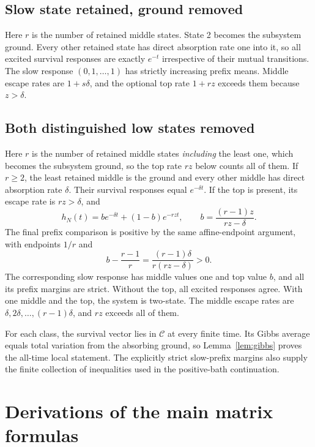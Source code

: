 \documentclass[11pt,a4paper]{article}
\theoremstyle{remark}\newtheorem{remark}[theorem]{Remark}
\newcommand{\C}{\mathcal C}
\begin{document}
\subsection{Slow state retained, ground removed}
Here $r$ is the number of retained middle states. State 2 becomes the subsystem ground. Every other retained state has direct absorption rate one into it, so all excited survival responses are exactly $e^{-t}$ irrespective of their mutual transitions. The slow response $(0,1,\ldots,1)$ has strictly increasing prefix means. Middle escape rates are $1+s\delta$, and the optional top rate $1+rz$ exceeds them because $z>\delta$.

\subsection{Both distinguished low states removed}
Here $r$ is the number of retained middle states \emph{including} the least one, which becomes the subsystem ground, so the top rate $rz$ below counts all of them. If $r\ge2$, the least retained middle is the ground and every other middle has direct absorption rate $\delta$. Their survival responses equal $e^{-\delta t}$. If the top is present, its escape rate is $rz>\delta$, and
\begin{equation}
 h_N(t)=be^{-\delta t}+(1-b)e^{-rzt},\qquad
 b=\frac{(r-1)z}{rz-\delta}.
\end{equation}
The final prefix comparison is positive by the same affine-endpoint argument, with endpoints $1/r$ and
\begin{equation}
 b-\frac{r-1}{r}=\frac{(r-1)\delta}{r(rz-\delta)}>0.
\end{equation}
The corresponding slow response has middle values one and top value $b$, and all its prefix margins are strict. Without the top, all excited responses agree. With one middle and the top, the system is two-state. The middle escape rates are $\delta,2\delta,\ldots,(r-1)\delta$, and $rz$ exceeds all of them.

For each class, the survival vector lies in $\C$ at every finite time. Its Gibbs average equals total variation from the absorbing ground, so Lemma~\ref{lem:gibbs} proves the all-time local statement. The explicitly strict slow-prefix margins also supply the finite collection of inequalities used in the positive-bath continuation.

\section{Derivations of the main matrix formulas}\label{app:derivations}
\end{document}
